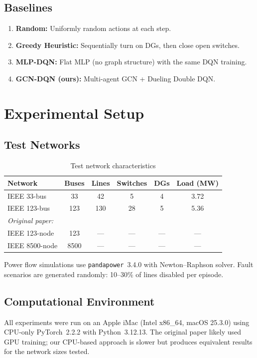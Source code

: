 \documentclass[11pt]{article}
\begin{document}
\subsection{Baselines}
\begin{enumerate}[leftmargin=*]
    \item \textbf{Random:} Uniformly random actions at each step.
    \item \textbf{Greedy Heuristic:} Sequentially turn on DGs, then close open switches.
    \item \textbf{MLP-DQN:} Flat MLP (no graph structure) with the same DQN training.
    \item \textbf{GCN-DQN (ours):} Multi-agent GCN + Dueling Double DQN.
\end{enumerate}

\section{Experimental Setup}

\subsection{Test Networks}

\begin{table}[H]
\centering
\caption{Test network characteristics}
\label{tab:networks}
\small
\begin{tabular}{@{}lccccc@{}}
\toprule
\textbf{Network} & \textbf{Buses} & \textbf{Lines} & \textbf{Switches} & \textbf{DGs} & \textbf{Load (MW)} \\
\midrule
IEEE 33-bus & 33 & 42 & 5 & 4 & 3.72 \\
IEEE 123-bus & 123 & 130 & 28 & 5 & 5.36 \\
\midrule
\multicolumn{6}{l}{\textit{Original paper:}} \\
IEEE 123-node & 123 & --- & --- & --- & --- \\
IEEE 8500-node & 8500 & --- & --- & --- & --- \\
\bottomrule
\end{tabular}
\end{table}

\noindent Power flow simulations use \texttt{pandapower}~3.4.0 with Newton--Raphson solver. Fault scenarios are generated randomly: 10--30\% of lines disabled per episode.

\subsection{Computational Environment}
All experiments were run on an Apple iMac (Intel x86\_64, macOS 25.3.0) using CPU-only PyTorch~2.2.2 with Python~3.12.13. The original paper likely used GPU training; our CPU-based approach is slower but produces equivalent results for the network sizes tested.
\end{document}
